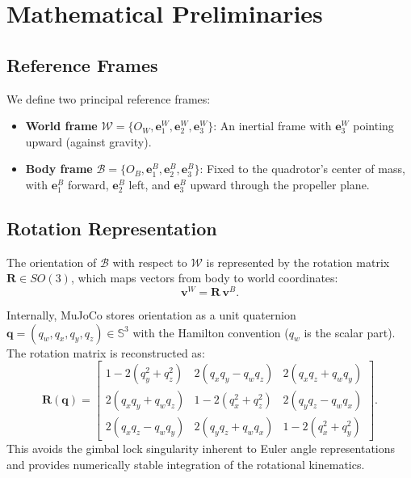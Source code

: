 \documentclass[journal]{IEEEtran}
\newcommand{\R}{\mathbf{R}}
\begin{document}
\section{Mathematical Preliminaries}
\label{sec:preliminaries}

\subsection{Reference Frames}

We define two principal reference frames:
\begin{itemize}
  \item \textbf{World frame} $\mathcal{W} = \{O_W, \mathbf{e}_1^W, \mathbf{e}_2^W, \mathbf{e}_3^W\}$: An inertial frame with $\mathbf{e}_3^W$ pointing upward (against gravity).
  \item \textbf{Body frame} $\mathcal{B} = \{O_B, \mathbf{e}_1^B, \mathbf{e}_2^B, \mathbf{e}_3^B\}$: Fixed to the quadrotor's center of mass, with $\mathbf{e}_1^B$ forward, $\mathbf{e}_2^B$ left, and $\mathbf{e}_3^B$ upward through the propeller plane.
\end{itemize}

\subsection{Rotation Representation}

The orientation of $\mathcal{B}$ with respect to $\mathcal{W}$ is represented by the rotation matrix $\R \in SO(3)$, which maps vectors from body to world coordinates:
\begin{equation}
  \mathbf{v}^W = \R \, \mathbf{v}^B.
  \label{eq:rotation}
\end{equation}

Internally, MuJoCo stores orientation as a unit quaternion $\mathbf{q} = (q_w, q_x, q_y, q_z) \in \mathbb{S}^3$ with the Hamilton convention ($q_w$ is the scalar part). The rotation matrix is reconstructed as:
\begin{equation}
  \R(\mathbf{q}) = \begin{bmatrix}
    1\!-\!2(q_y^2\!+\!q_z^2) & 2(q_x q_y\!-\!q_w q_z) & 2(q_x q_z\!+\!q_w q_y) \\
    2(q_x q_y\!+\!q_w q_z) & 1\!-\!2(q_x^2\!+\!q_z^2) & 2(q_y q_z\!-\!q_w q_x) \\
    2(q_x q_z\!-\!q_w q_y) & 2(q_y q_z\!+\!q_w q_x) & 1\!-\!2(q_x^2\!+\!q_y^2)
  \end{bmatrix}.
  \label{eq:quat_to_rot}
\end{equation}
This avoids the gimbal lock singularity inherent to Euler angle representations and provides numerically stable integration of the rotational kinematics.
\end{document}
